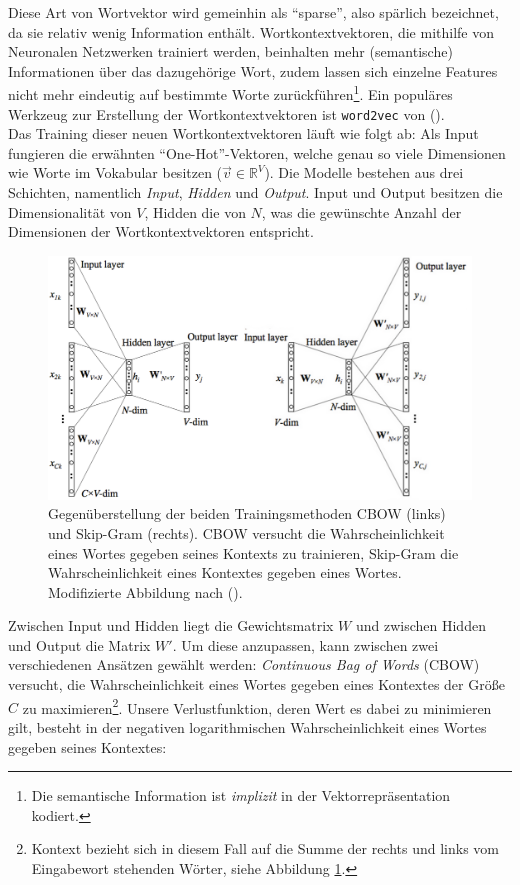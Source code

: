 Diese Art von Wortvektor wird gemeinhin als ``sparse'', also spärlich bezeichnet, da sie relativ wenig Information enthält.
Wortkontextvektoren, die mithilfe von Neuronalen Netzwerken trainiert werden, beinhalten mehr (semantische) Informationen über das dazugehörige Wort, zudem lassen sich einzelne Features
nicht mehr eindeutig auf bestimmte Worte zurückführen\footnote{Die semantische Information ist \emph{implizit} in der
Vektorrepräsentation kodiert.}. Ein populäres Werkzeug zur Erstellung der Wortkontextvektoren ist \verb|word2vec| von
(\cite{mikolov2013efficient}).\\

Das Training dieser neuen Wortkontextvektoren läuft wie folgt ab:
Als Input fungieren die erwähnten ``One-Hot''-Vektoren, welche genau so viele Dimensionen wie Worte im Vokabular besitzen
($\vec{v} \in \mathbb{R}^V$).
Die Modelle bestehen aus drei Schichten, namentlich \emph{Input}, \emph{Hidden} und \emph{Output}.
Input und Output besitzen die Dimensionalität von $V$, Hidden die von $N$, was die gewünschte Anzahl der Dimensionen der
Wortkontextvektoren entspricht.\\

\begin{figure}[h]
  \centering
  \includegraphics[width=1.1\textwidth]{../img/cbowskip.png}
  \caption[Gegenüberstellung von Skip-Gram und CBOW]{Gegenüberstellung der beiden Trainingsmethoden CBOW (links)
  und Skip-Gram (rechts). CBOW versucht die Wahrscheinlichkeit eines Wortes gegeben seines Kontexts zu trainieren,
  Skip-Gram die Wahrscheinlichkeit eines Kontextes gegeben eines Wortes. Modifizierte Abbildung nach
  (\cite{rong2014word2vec}).\label{fig:cbowskip}}
\end{figure}

Zwischen Input und Hidden liegt die Gewichtsmatrix $W$ und zwischen Hidden und Output die Matrix $W'$.
Um diese anzupassen, kann zwischen zwei verschiedenen Ansätzen gewählt werden:
\emph{Continuous Bag of Words} (CBOW) versucht, die Wahrscheinlichkeit eines Wortes gegeben eines Kontextes
der Größe $C$ zu maximieren\footnote{Kontext bezieht sich in diesem Fall auf die Summe der rechts und links vom Eingabewort stehenden
Wörter, siehe Abbildung \ref{fig:cbowskip}.}. Unsere Verlustfunktion, deren Wert es dabei zu minimieren gilt,
besteht in der negativen logarithmischen Wahrscheinlichkeit eines Wortes gegeben seines Kontextes:

